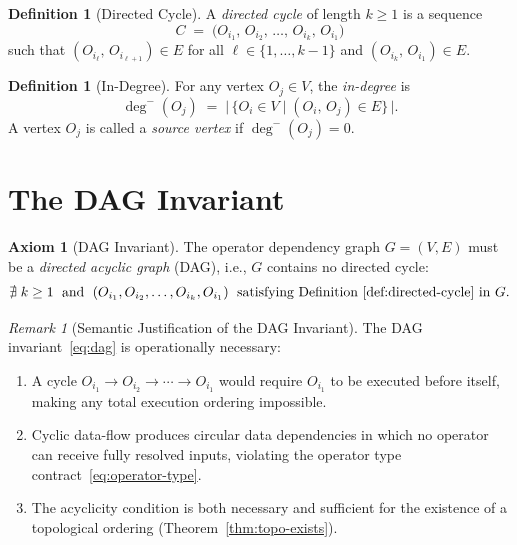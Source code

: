 \documentclass[12pt,openany]{book}
\numberwithin{equation}{chapter}
\theoremstyle{plain}
\theoremstyle{definition}
\newtheorem{definition}[theorem]{Definition}
\newtheorem{axiom}[theorem]{Axiom}
\theoremstyle{remark}
\newtheorem{remark}[theorem]{Remark}
\numberwithin{equation}{chapter}
\theoremstyle{plain}
\begin{document}
\begin{definition}[Directed Cycle]
\label{def:directed-cycle}
A \emph{directed cycle} of length $k \geq 1$ is a sequence
\begin{equation}
  C \;=\; \bigl(O_{i_1},\, O_{i_2},\, \ldots,\, O_{i_k},\, O_{i_1}\bigr)
  \label{eq:directed-cycle}
\end{equation}
such that $(O_{i_\ell},\, O_{i_{\ell+1}}) \in E$ for all
$\ell \in \{1, \ldots, k-1\}$ and $(O_{i_k},\, O_{i_1}) \in E$.
\end{definition}

\begin{definition}[In-Degree]
\label{def:in-degree}
For any vertex $O_j \in V$, the \emph{in-degree} is
\begin{equation}
  \deg^{-}(O_j)
  \;=\;
  \bigl|\,\{O_i \in V \mid (O_i,\, O_j) \in E\}\,\bigr|.
  \label{eq:in-degree}
\end{equation}
A vertex $O_j$ is called a \emph{source vertex} if $\deg^{-}(O_j) = 0$.
\end{definition}

\section{The DAG Invariant}
\label{sec:dag-invariant}

\begin{axiom}[DAG Invariant]
\label{ax:dag}
The operator dependency graph $G = (V, E)$ must be a
\emph{directed acyclic graph} (DAG), i.e., $G$ contains no directed cycle:
\begin{equation}
  \nexists\; k \geq 1 \;\text{ and }\;
  (O_{i_1}, O_{i_2}, \ldots, O_{i_k}, O_{i_1})
  \;\text{ satisfying Definition~\ref{def:directed-cycle} in } G.
  \label{eq:dag}
\end{equation}
\end{axiom}

\begin{remark}[Semantic Justification of the DAG Invariant]
\label{rem:dag-semantic}
The DAG invariant~\eqref{eq:dag} is operationally necessary:
\begin{enumerate}
  \item A cycle $O_{i_1} \to O_{i_2} \to \cdots \to O_{i_1}$ would
        require $O_{i_1}$ to be executed before itself, making
        any total execution ordering impossible.
  \item Cyclic data-flow produces circular data dependencies in which
        no operator can receive fully resolved inputs, violating the
        operator type contract~\eqref{eq:operator-type}.
  \item The acyclicity condition is both necessary and sufficient for
        the existence of a topological ordering
        (Theorem~\ref{thm:topo-exists}).
\end{enumerate}
\end{remark}
\end{document}
